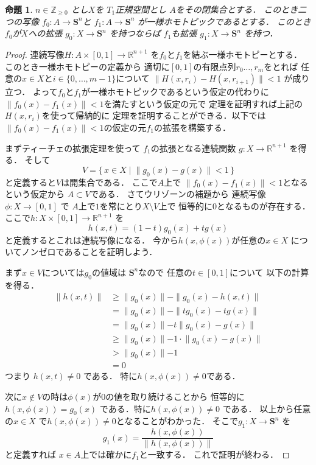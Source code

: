 \documentclass[leqno, a4paper, 12pt]{jsarticle}
\newtheorem{prop}[thm]{命題}
\newcommand{\zz}{\mathbb{Z}}
\newcommand{\rr}{\mathbb{R}}
\newcommand{\mysphere}[1]{\mathbf{S}^{#1}}
\numberwithin{equation}{section}
\begin{document}
\begin{prop}\label{prop:26homotopy}
$n\in \zz_{\ge 0}$
とし$X$を
$T_{1}$正規空間とし
$A$をその閉集合とする．
このとき二つの写像
$f_{0}\colon A\to \mysphere{n}$と
$f_{1}\colon A\to \mysphere{n}$
が一様ホモトピックであるとする．
このとき$f_{0}$が$X$への拡張
$g_{0}\colon X\to \mysphere{n}$
を持つならば
$f_{1}$も拡張
$g_{1}\colon X\to \mysphere{n}$
を持つ．
\end{prop}
\begin{proof}
連続写像$H\colon A\times [0, 1]\to \rr^{n+1}$
を$f_{0}$と$f_{1}$を結ぶ一様ホモトピーとする．
このとき一様ホモトピーの定義から
適切に$[0, 1]$の有限点列$r_{0}\dots, r_{m}$をとれば
任意の$x\in X$と$i\in\{0, \dots, m-1\}$について
$\lVert H(x, r_{i})-H(x, r_{i+1}) \rVert<1$
が成り立つ．
よって$f_{0}$と$f_{1}$が一様ホモトピックであるという仮定の代わりに
$\lVert f_{0}(x)-f_{1}(x)\rVert<1$を満たすという仮定の元で
定理を証明すれば上記の$H(x, r_{i})$を使って帰納的に
定理を証明することができる．以下では$\lVert f_{0}(x)-f_{1}(x)\rVert<1$の仮定の元$f_{1}$の拡張を構築する．

まずティーチェの拡張定理を使って
$f_{1}$の拡張となる連続関数
$g\colon X\to \rr^{n+1}$
を得る．
そして
\[
V=\{\, x\in X\mid \lVert g_{0}(x)-g(x) \rVert<1\, \}
\]
と定義すると$V$は開集合である．
ここで$A$上で
$\lVert f_{0}(x)-f_{1}(x)\rVert <1$となるという仮定から
$A\subset V$である．
さてウリゾーンの補題から
連続写像$\phi\colon X\to [0, 1]$
で
$A$上で$1$を常にとり$X\setminus V$上で
恒等的に$0$となるものが存在する．
ここで$h\colon X\times [0, 1]\to \rr^{n+1}$
を
\[
h(x, t)=(1-t)g_{0}(x)+tg(x)
\]
と定義するとこれは連続写像になる．
今から$h(x, \phi(x))$が任意の$x\in X$
についてノンゼロであることを証明しよう．

まず$x\in V$については$g_{0}$の値域は
$\mysphere{n}$なので
任意の$t\in [0, 1]$について
以下の計算を得る．
\begin{align*}
\lVert h(x, t)\rVert&\ge 
\lVert g_{0}(x)\lVert -\lVert g_{0}(x)-h(x, t) \rVert\\
&=\lVert g_{0}(x)\lVert -\lVert tg_{0}(x)-tg(x) \rVert\\
&=\lVert g_{0}(x)\lVert -t\lVert g_{0}(x)-g(x) \rVert\\
&\ge \lVert g_{0}(x)\lVert -1\cdot \lVert g_{0}(x)-g(x) \rVert\\
&>\lVert g_{0}(x)\lVert -1\\
&=0
\end{align*}
つまり
$h(x, t)\neq 0$
である．
特に$h(x, \phi(x))\neq 0$である．

次に$x\not \in V$の時は$\phi(x)$が$0$の値を取り続けることから
恒等的に$h(x, \phi(x))=g_{0}(x)$
である．特に$h(x, \phi(x))\neq 0$
である．
以上から任意の$x\in X$
で$h(x, \phi(x))\neq 0$となることがわかった．
そこで$g_{1}\colon X\to \mysphere{n}$
を
\[
g_{1}(x)=\frac{h(x, \phi(x))}{\lVert h(x, \phi(x))\rVert}
\]
と定義すれば
$x\in A$上では確かに$f_{1}$と一致する．
これで証明が終わる．
\end{proof}
\end{document}
